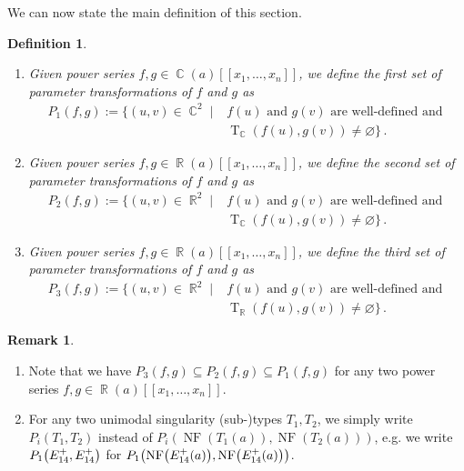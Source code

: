 \documentclass[noend]{amsproc}
\newtheorem{defn}[theorem]{Definition}
\theoremstyle{definition}
\newtheorem{remark}[theorem]{Remark}
\let\originalleft\left
\let\originalright\right
\renewcommand{\left}{\mathopen{}\mathclose\bgroup\originalleft}
\renewcommand{\right}{\aftergroup\egroup\originalright}
\DeclareMathOperator{\R}{\mathbb{R}}
\DeclareMathOperator{\C}{\mathbb{C}}
\DeclareMathOperator{\NF}{NF}
\DeclareMathOperator{\T}{T}
\begin{document}
We can now state the main definition of this section.

\begin{defn}\label{def:Psets}
\leavevmode
\begin{enumerate}
\item
Given power series $f,g \in \C(a)[[x_1,\ldots,x_n]]$, we define the
first set of parameter transformations of $f$ and $g$ as
\begin{align*}
P_1(f, g)
:= \bigl\{ (u, v) \in \C^2 \mid
&f(u) \text{ and } g(v) \text{ are well-defined and } \\
&\T_{\C}(f(u), g(v)) \neq \varnothing \bigr\} \,.
\end{align*}

\item
Given power series $f,g \in \R(a)[[x_1,\ldots,x_n]]$, we define the
second set of parameter transformations of $f$ and $g$ as
\begin{align*}
P_2(f, g)
:= \bigl\{ (u, v) \in \R^2 \mid
&f(u) \text{ and } g(v) \text{ are well-defined and } \\
&\T_{\C}(f(u), g(v)) \neq \varnothing \bigr\} \,.
\end{align*}

\item
Given power series $f,g \in \R(a)[[x_1,\ldots,x_n]]$, we define the
third set of parameter transformations of $f$ and $g$ as
\begin{align*}
P_3(f, g)
:= \bigl\{ (u, v) \in \R^2 \mid
&f(u) \text{ and } g(v) \text{ are well-defined and } \\
&\T_{\R}(f(u), g(v)) \neq \varnothing \bigr\} \,.
\end{align*}
\end{enumerate}
\end{defn}

\begin{remark}
\leavevmode
\begin{enumerate}
\item
Note that we have $P_3(f, g) \subseteq P_2(f, g) \subseteq P_1(f, g)$ for any
two power series $f,g \in \R(a)[[x_1,\ldots,x_n]]$.

\item
For any two unimodal singularity (sub-)types $T_1, T_2$, we simply write
$P_i(T_1,T_2)$ instead of $P_i(\NF(T_1(a)), \NF(T_2(a)))$, e.g. we write
$P_1\left(E_{14}^+, E_{14}^+\right)$ for
$P_1\left(\NF\left(E_{14}^+(a)\right), \NF\left(E_{14}^+(a)\right)\right)$.
\end{enumerate}
\end{remark}
\end{document}
